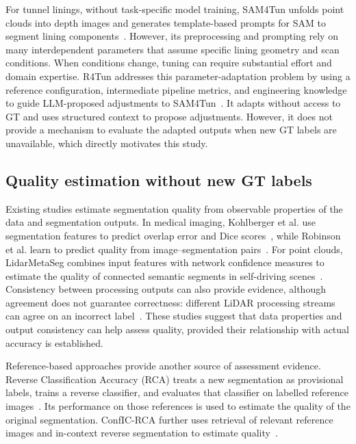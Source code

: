 \documentclass[a4paper,fleqn]{cas-dc}
\begin{document}
For tunnel linings,  without task-specific model training, SAM4Tun unfolds point clouds into depth images and generates template-based prompts for SAM to segment lining components~\cite{ye2025sam4tun}. However, its preprocessing and prompting rely on many interdependent parameters that assume specific lining geometry and scan conditions. When conditions change, tuning can require substantial effort and domain expertise. R4Tun addresses this parameter-adaptation problem by using a reference configuration, intermediate pipeline metrics, and engineering knowledge to guide LLM-proposed adjustments to SAM4Tun~\cite{taoR4Tun}. It adapts without access to GT and uses structured context to propose adjustments. However, it does not provide a mechanism to evaluate the adapted outputs when new GT labels are unavailable, which directly motivates this study.

\subsection{Quality estimation without new GT labels}

Existing studies estimate segmentation quality from observable properties of the data and segmentation outputs. In medical imaging, Kohlberger et al. use segmentation features to predict overlap error and Dice scores~\cite{kohlberger2012evaluating}, while Robinson et al. learn to predict quality from image--segmentation pairs~\cite{robinson2018segmentationQuality}. For point clouds, LidarMetaSeg combines input features with network confidence measures to estimate the quality of connected semantic segments in self-driving scenes~\cite{colling2021lidarmetaseg}. Consistency between processing outputs can also provide evidence, although agreement does not guarantee correctness: different LiDAR processing streams can agree on an incorrect label~\cite{bogdoll2025labelfree}. These studies suggest that data properties and output consistency can help assess quality, provided their relationship with actual accuracy is established.

Reference-based approaches provide another source of assessment evidence. Reverse Classification Accuracy (RCA) treats a new segmentation as provisional labels, trains a reverse classifier, and evaluates that classifier on labelled reference images~\cite{valindria2017rca}. Its performance on those references is used to estimate the quality of the original segmentation. ConfIC-RCA further uses retrieval of relevant reference images and in-context reverse segmentation to estimate quality~\cite{cosarinsky2026conficrca}.
\end{document}
